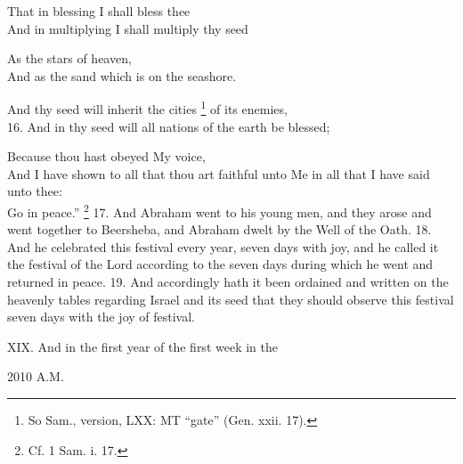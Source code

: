 That in blessing I shall bless thee\\
And in multiplying I shall multiply thy seed

As the stars of heaven,\\
And as the sand which is on the seashore.

And thy seed will inherit the cities \footnote{So Sam., version, LXX: MT ``gate'' (Gen. xxii. 17).} of its enemies,\\
16. And in thy seed will all nations of the earth be blessed;

Because thou hast obeyed My voice,\\
And I have shown to all that thou art faithful unto Me in all that I have said unto thee:\\
Go in peace.'' \footnote{Cf. 1 Sam. i. 17.} 17. And Abraham went to his young men, and they arose and went together to Beersheba, and Abraham dwelt by the Well of the Oath. 18. And he celebrated this festival every year, seven days with joy, and he called it the festival of the Lord according to the seven days during which he went and returned in peace. 19. And accordingly hath it been ordained and written on the heavenly tables regarding Israel and its seed that they should observe this festival seven days with the joy of festival.


XIX. And in the first year of the first week in the

2010 A.M.

